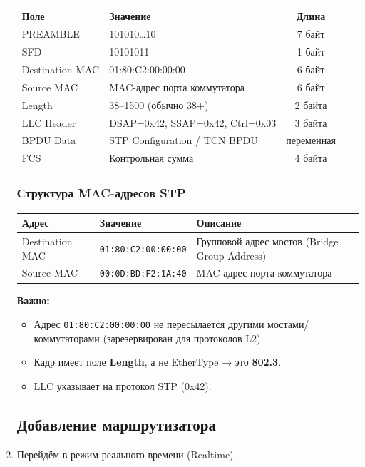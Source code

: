 \begin{enumerate}
\begin{center}
\begin{tabular}{|l|l|c|}
\hline
\textbf{Поле} & \textbf{Значение} & \textbf{Длина} \\
\hline
PREAMBLE & 101010…10 & 7 байт \\
SFD & 10101011 & 1 байт \\
Destination MAC & 01:80:C2:00:00:00 & 6 байт \\
Source MAC & MAC-адрес порта коммутатора & 6 байт \\
Length & 38–1500 (обычно 38+) & 2 байта \\
LLC Header & DSAP=0x42, SSAP=0x42, Ctrl=0x03 & 3 байта \\
BPDU Data & STP Configuration / TCN BPDU & переменная \\
FCS & Контрольная сумма & 4 байта \\
\hline
\end{tabular}
\end{center}

\subsubsection*{Структура MAC-адресов STP}
\begin{center}
\begin{tabular}{|l|l|l|}
\hline
\textbf{Адрес} & \textbf{Значение} & \textbf{Описание} \\
\hline
Destination MAC & \texttt{01:80:C2:00:00:00} & Групповой адрес мостов (Bridge Group Address) \\
Source MAC & \texttt{00:0D:BD:F2:1A:40} & MAC-адрес порта коммутатора \\
\hline
\end{tabular}
\end{center}

\textbf{Важно:}
\begin{itemize}
    \item Адрес \texttt{01:80:C2:00:00:00} не пересылается другими мостами/коммутаторами (зарезервирован для протоколов L2).
    \item Кадр имеет поле \textbf{Length}, а не EtherType → это \textbf{802.3}.
    \item LLC указывает на протокол STP (0x42).
\end{itemize}

\subsection*{Добавление маршрутизатора}
\item Перейдём в режим реального времени (Realtime).


\end{enumerate}
